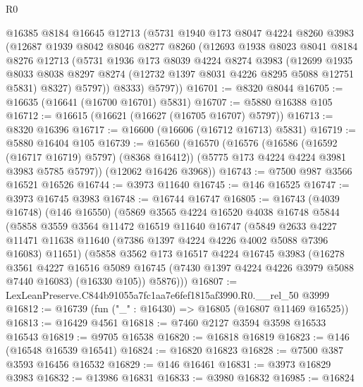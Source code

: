 \begin{lexlean}{R0}
\begin{coremodule}
      @16385
      @8184
      @16645
      @12713
      (@5731
        @1940
        @173
        @8047
        @4224
        @8260
        @3983
        (@12687
          @1939
          @8042
          @8046
          @8277
          @8260
          (@12693
            @1938
            @8023
            @8041
            @8184
            @8276
            @12713
            (@5731
              @1936
              @173
              @8039
              @4224
              @8274
              @3983
              (@12699
                @1935
                @8033
                @8038
                @8297
                @8274
                (@12732 @1397 @8031 @4226 @8295 @5088 @12751 @5831)
                @8327)
              @5797))
          @8333)
        @5797))
@16701 := @8320 @8044
@16705 := @16635 (@16641 (@16700 @16701) @5831)
@16707 := @5880 @16388 @105
@16712 := @16615 (@16621 (@16627 (@16705 @16707) @5797))
@16713 := @8320 @16396
@16717 := @16600 (@16606 (@16712 @16713) @5831)
@16719 := @5880 @16404 @105
@16739 := @16560
    (@16570
      (@16576
        (@16586 (@16592 (@16717 @16719) @5797) (@8368 @16412))
        (@5775 @173 @4224 @4224 @3981 @3983 @5785 @5797))
      (@12062 @16426 @3968))
@16743 := @7500 @987 @3566 @16521 @16526
@16744 := @3973 @11640
@16745 := @146 @16525
@16747 := @3973 @16745 @3983
@16748 := @16744 @16747
@16805 := @16743
    (@4039 @16748)
    (@146 @16550)
    (@5869
      @3565
      @4224
      @16520
      @4038
      @16748
      @5844
      (@5858
        @3559
        @3564
        @11472
        @16519
        @11640
        @16747
        (@5849
          @2633
          @4227
          @11471
          @11638
          @11640
          (@7386 @1397 @4224 @4226 @4002 @5088 @7396 @16083)
          @11651)
        (@5858
          @3562
          @173
          @16517
          @4224
          @16745
          @3983
          (@16278
            @3561
            @4227
            @16516
            @5089
            @16745
            (@7430 @1397 @4224 @4226 @3979 @5088 @7440 @16083)
            (@16330 @105))
          @5876)))
@16807 := LexLeanPreserve.C844b91055a7fc1aa7e6fef1815af3990.R0.__rel_50 @3999
@16812 := @16739 (fun ("_" : @16430) => @16805 (@16807 @11469 @16525))
@16813 := @16429 @4561
@16818 := @7460 @2127 @3594 @3598 @16533 @16543
@16819 := @9705 @16538
@16820 := @16818 @16819
@16823 := @146 (@16548 @16539 @16541)
@16824 := @16820 @16823
@16828 := @7500 @387 @3593 @16456 @16532
@16829 := @146 @16461
@16831 := @3973 @16829 @3983
@16832 := @13986 @16831
@16833 := @3980 @16832
@16985 := @16824

\end{coremodule}
\end{lexlean}
